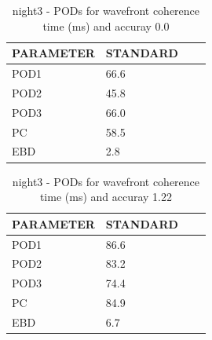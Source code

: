 \begin{table}[p!]
\begin{center}
\begin{tabular}{|l|l|l|l|}
\hline
\multicolumn{1}{|c|}{\cellcolor[HTML]{C0C0C0}\textbf{PARAMETER}} & \multicolumn{1}{c|}{\cellcolor[HTML]{C0C0C0}\textbf{STANDARD}} \\
\hline
\cellcolor[HTML]{C0C0C0}POD1  & 66.6                                \\
\cellcolor[HTML]{C0C0C0}POD2  & 45.8                                \\
\cellcolor[HTML]{C0C0C0}POD3  & 66.0                                \\
\cellcolor[HTML]{C0C0C0}PC    & 58.5                                  \\
\cellcolor[HTML]{C0C0C0}EBD   & 2.8                                 \\
\hline
\end{tabular}
\caption{night3 - PODs for wavefront coherence time (ms) and accuray 0.0}
\label{tab:podtau0.0:night3}
\end{center}
\end{table}
\begin{table}[p!]
\begin{center}
\begin{tabular}{|l|l|l|l|}
\hline
\multicolumn{1}{|c|}{\cellcolor[HTML]{C0C0C0}\textbf{PARAMETER}} & \multicolumn{1}{c|}{\cellcolor[HTML]{C0C0C0}\textbf{STANDARD}} \\
\hline
\cellcolor[HTML]{C0C0C0}POD1  & 86.6                                \\
\cellcolor[HTML]{C0C0C0}POD2  & 83.2                                \\
\cellcolor[HTML]{C0C0C0}POD3  & 74.4                                \\
\cellcolor[HTML]{C0C0C0}PC    & 84.9                                  \\
\cellcolor[HTML]{C0C0C0}EBD   & 6.7                                 \\
\hline
\end{tabular}
\caption{night3 - PODs for wavefront coherence time (ms) and accuray 1.22}
\label{tab:podtau1.22:night3}
\end{center}
\end{table}
